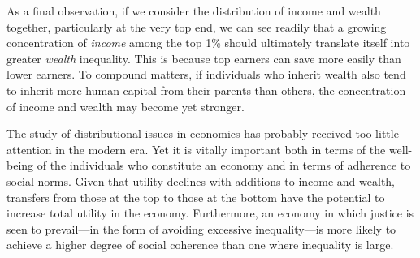 As a final observation, if we consider the distribution of income and wealth
together, particularly at the very top end, we can see readily that a
growing concentration of \textit{income} among the top 1\% should ultimately
translate itself into greater \textit{wealth} inequality. This is because
top earners can save more easily than lower earners. To compound matters, if
individuals who inherit wealth also tend to inherit more human capital from
their parents than others, the concentration of income and wealth may become
yet stronger.

The study of distributional issues in economics has probably received too
little attention in the modern era. Yet it is vitally important both in
terms of the well-being of the individuals who constitute an economy and in
terms of adherence to social norms. Given that utility declines with
additions to income and wealth, transfers from those at the top to those at
the bottom have the potential to increase total utility in the economy.
Furthermore, an economy in which justice is seen to prevail---in the form of
avoiding excessive inequality---is more likely to achieve a higher degree of
social coherence than one where inequality is large.